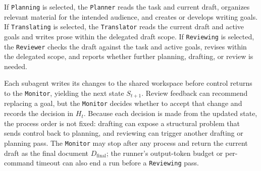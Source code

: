 If \texttt{Planning} is selected, the \texttt{Planner} reads the task and current draft, organizes relevant material for the intended audience, and creates or develops writing goals.
If \texttt{Translating} is selected, the \texttt{Translator} reads the current draft and active goals and writes prose within the delegated draft scope.
If \texttt{Reviewing} is selected, the \texttt{Reviewer} checks the draft against the task and active goals, revises within the delegated scope, and reports whether further planning, drafting, or review is needed.

Each subagent writes its changes to the shared workspace before control returns to the \texttt{Monitor}, yielding the next state $S_{t+1}$.
Review feedback can recommend replacing a goal, but the \texttt{Monitor} decides whether to accept that change and records the decision in $H_t$.
Because each decision is made from the updated state, the process order is not fixed: drafting can expose a structural problem that sends control back to planning, and reviewing can trigger another drafting or planning pass.
The \texttt{Monitor} may stop after any process and return the current draft as the final document $D_{\mathrm{final}}$; the runner's output-token budget or per-command timeout can also end a run before a \texttt{Reviewing} pass.
